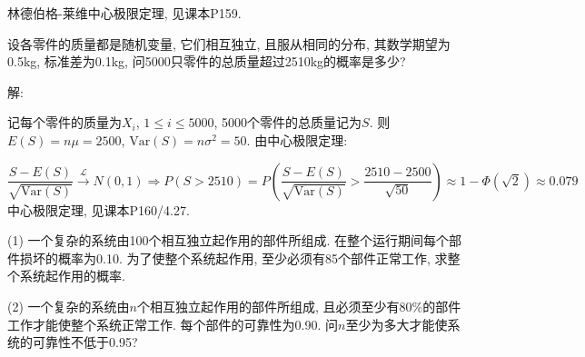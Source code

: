 \documentclass[standard]{ExBook}
\begin{document}
\begin{qitems}
\begin{bbox}
\textcolor{themeColor}{\selectfont {}
林德伯格-莱维中心极限定理, 见课本P159.}
    \end{bbox}

\vspace{-5em}

    \begin{bbox}
    \begin{shaded}
        \qitem
设各零件的质量都是随机变量, 它们相互独立, 且服从相同的分布, 其数学期望为0.5kg, 标准差为0.1kg, 问5000只零件的总质量超过2510kg的概率是多少?
    \end{shaded}
    \end{bbox}

\vspace{-5em}

    \begin{bbox}
解: 

记每个零件的质量为$X_i$, $1\leq i\leq 5000$, 5000个零件的总质量记为$S$. 则$E(S)=n\mu=2500$, $\mathrm{Var}(S)=n\sigma^2=50$. 由中心极限定理:
    \end{bbox}

\vspace{-5em}

    \begin{bbox}
$$\displaystyle\frac{S-E(S)}{\sqrt{\mathrm{Var}(S)}} \xrightarrow{\mathcal{L}} N(0,1) \Longrightarrow P(S>2510) = P\left(\frac{S-E(S)}{\sqrt{\mathrm{Var}(S)}}>\frac{2510-2500}{\sqrt{50}}\right) \approx 1-\Phi\left(\sqrt{2}\right)\approx0.079$$
\textcolor{themeColor}{\selectfont {} 中心极限定理, 见课本P160/4.27.}
    \end{bbox}

\vspace{-5em}

    \begin{bbox}
    \begin{shaded}
        \qitem

(1) 一个复杂的系统由100个相互独立起作用的部件所组成. 在整个运行期间每个部件损坏的概率为0.10. 为了使整个系统起作用, 至少必须有85个部件正常工作, 求整个系统起作用的概率.

(2) 一个复杂的系统由$ n $个相互独立起作用的部件所组成, 且必须至少有80\%的部件工作才能使整个系统正常工作. 每个部件的可靠性为0.90. 问$ n $至少为多大才能使系统的可靠性不低于0.95?
    \end{shaded}
    \end{bbox}

\vspace{-5em}


\end{qitems}
\end{document}
